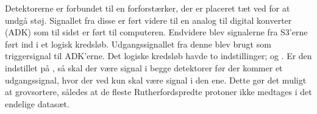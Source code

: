 Detektorerne er forbundet til en forforstærker, der er placeret tæt ved for at undgå støj. Signallet
fra disse er ført videre til en analog til digital konverter (ADK) som til sidst er ført til
computeren. Endvidere blev signalerne fra S3'erne ført ind i et logisk kredsløb. Udgangssignallet
fra denne blev brugt som triggersignal til ADK'erne. Det logiske kredsløb havde to indstillinger; \lAND
og \lOR. Er den indstillet på \lAND, så skal der være signal i begge detektorer før der kommer et udgangssignal,
hvor der ved \lOR kun skal være signal i den ene. Dette gør det muligt at grovsortere, således at de
fleste Rutherfordspredte protoner ikke medtages i det endelige datasæt.
